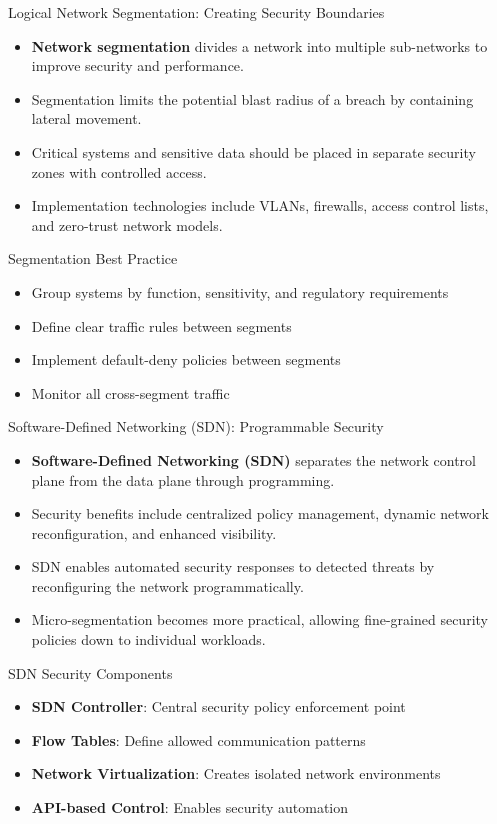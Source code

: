 \documentclass{beamer}
\begin{document}
\begin{frame}{Logical Network Segmentation: Creating Security Boundaries}
\begin{itemize}
\item \textbf{Network segmentation} divides a network into multiple sub-networks to improve security and performance.
\item Segmentation limits the potential blast radius of a breach by containing lateral movement.
\item Critical systems and sensitive data should be placed in separate security zones with controlled access.
\item Implementation technologies include VLANs, firewalls, access control lists, and zero-trust network models.
\end{itemize}

\begin{block}{Segmentation Best Practice}
\begin{itemize}
\item Group systems by function, sensitivity, and regulatory requirements
\item Define clear traffic rules between segments
\item Implement default-deny policies between segments
\item Monitor all cross-segment traffic
\end{itemize}
\end{block}
\end{frame}

\begin{frame}{Software-Defined Networking (SDN): Programmable Security}
    \begin{itemize}
    \item \textbf{Software-Defined Networking (SDN)} separates the network control plane from the data plane through programming.
    \item Security benefits include centralized policy management, dynamic network reconfiguration, and enhanced visibility.
    \item SDN enables automated security responses to detected threats by reconfiguring the network programmatically.
    \item Micro-segmentation becomes more practical, allowing fine-grained security policies down to individual workloads.
    \end{itemize}
    
    \begin{block}{SDN Security Components}
    \begin{itemize}
    \item \textbf{SDN Controller}: Central security policy enforcement point
    \item \textbf{Flow Tables}: Define allowed communication patterns
    \item \textbf{Network Virtualization}: Creates isolated network environments
    \item \textbf{API-based Control}: Enables security automation
    \end{itemize}
    \end{block}
    \end{frame}
    
\end{document}
